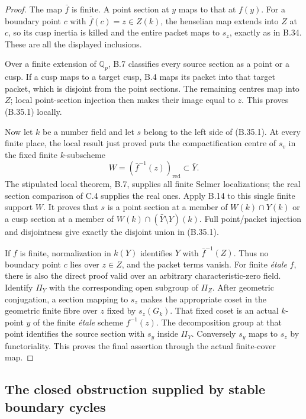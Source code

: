 \documentclass[11pt,oneside]{article}
\begin{document}
\begin{proof}
The map $\bar f$ is finite. A point section at $y$ maps
to that at $f(y)$. For a boundary point $c$ with
$\bar f(c)=z\in Z(k)$, the henselian map extends into
$Z$ at $c$, so its cusp inertia is killed and the
entire packet maps to $s_z$, exactly as in B.34.
These are all the displayed inclusions.

Over a finite extension of $\mathbb Q_p$, B.7 classifies
every source section as a point or a cusp. If a cusp
maps to a target cusp, B.4 maps its packet into that
target packet, which is disjoint from the point
sections. The remaining centres map into $Z$; local
point-section injection then makes their image equal
to $z$. This proves (B.35.1) locally.

Now let $k$ be a number field and let $s$ belong to
the left side of (B.35.1). At every finite place,
the local result just proved puts the compactification
centre of $s_v$ in the fixed finite $k$-subscheme
\[
 W=(\bar f^{-1}(z))_{\mathrm{red}}\subset\bar Y.
\]
The stipulated local theorem, B.7, supplies all finite
Selmer localizations; the real section comparison
of C.4 supplies the real ones. Apply B.14 to this
single finite support $W$. It proves that $s$ is a
point section at a member of $W(k)\cap Y(k)$ or a
cusp section at a member of
$W(k)\cap(\bar Y\setminus Y)(k)$.
Full point/packet injection and disjointness give
exactly the disjoint union in (B.35.1).

If $f$ is finite, normalization in $k(Y)$ identifies
$Y$ with $\bar f^{-1}(Z)$. Thus no boundary point
$c$ lies over $z\in Z$, and the packet terms vanish.
For finite \emph{\'etale} $f$, there is also the direct
proof valid over an arbitrary characteristic-zero
field. Identify $\Pi_Y$ with the corresponding open
subgroup of $\Pi_Z$. After geometric conjugation,
a section mapping to $s_z$ makes the appropriate
coset in the geometric finite fibre over $z$ fixed
by $s_z(G_k)$. That fixed coset is an actual
$k$-point $y$ of the finite \emph{\'etale} scheme
$f^{-1}(z)$. The decomposition group at that point
identifies the source section with $s_y$ inside
$\Pi_Y$. Conversely $s_y$ maps to $s_z$ by
functoriality. This proves the final assertion
through the actual finite-cover map.
\end{proof}

\subsection{The closed obstruction supplied by stable boundary cycles}
\end{document}
